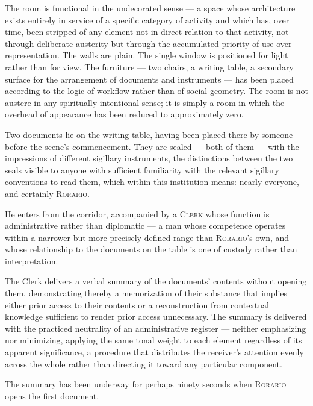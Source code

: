 \documentclass[12pt, oneside]{article}
\newenvironment{action}{%
  \vspace{0.6em}%
  \noindent\ignorespaces%
}{%
  \par\vspace{0.6em}%
}
\begin{document}
\begin{action}
The room is functional in the undecorated sense --- a space whose architecture exists entirely in service of a specific category of activity and which has, over time, been stripped of any element not in direct relation to that activity, not through deliberate austerity but through the accumulated priority of use over representation. The walls are plain. The single window is positioned for light rather than for view. The furniture --- two chairs, a writing table, a secondary surface for the arrangement of documents and instruments --- has been placed according to the logic of workflow rather than of social geometry. The room is not austere in any spiritually intentional sense; it is simply a room in which the overhead of appearance has been reduced to approximately zero.

Two documents lie on the writing table, having been placed there by someone before the scene's commencement. They are sealed --- both of them --- with the impressions of different sigillary instruments, the distinctions between the two seals visible to anyone with sufficient familiarity with the relevant sigillary conventions to read them, which within this institution means: nearly everyone, and certainly \textsc{Rorario}.

He enters from the corridor, accompanied by a \textsc{Clerk} whose function is administrative rather than diplomatic --- a man whose competence operates within a narrower but more precisely defined range than \textsc{Rorario}'s own, and whose relationship to the documents on the table is one of custody rather than interpretation.
\end{action}

\begin{action}
The Clerk delivers a verbal summary of the documents' contents without opening them, demonstrating thereby a memorization of their substance that implies either prior access to their contents or a reconstruction from contextual knowledge sufficient to render prior access unnecessary. The summary is delivered with the practiced neutrality of an administrative register --- neither emphasizing nor minimizing, applying the same tonal weight to each element regardless of its apparent significance, a procedure that distributes the receiver's attention evenly across the whole rather than directing it toward any particular component.

The summary has been underway for perhaps ninety seconds when \textsc{Rorario} opens the first document.
\end{action}
\end{document}
